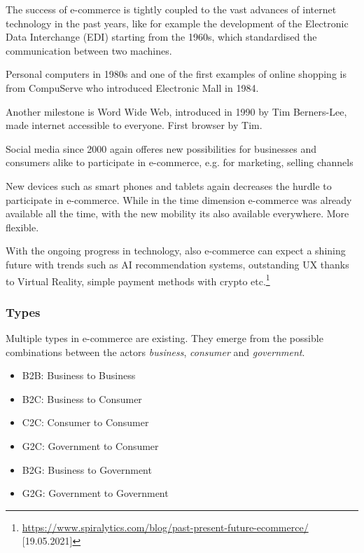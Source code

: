 The success of e-commerce is tightly coupled to the vast advances of internet technology in the past years, like for example the development of the Electronic Data Interchange (EDI) starting from the 1960s, which standardised the communication between two machines.

Personal computers in 1980s and one of the first examples of online shopping is from CompuServe who introduced Electronic Mall in 1984.

Another milestone is Word Wide Web, introduced in 1990 by Tim Berners-Lee, made internet accessible to everyone.
First browser by Tim.

Social media since 2000 again offeres new possibilities for businesses and consumers alike to participate in e-commerce, e.g. for marketing, selling channels

New devices such as smart phones and tablets again decreases the hurdle to participate in e-commerce.
While in the time dimension e-commerce was already available all the time, with the new mobility its also available everywhere.
More flexible.

With the ongoing progress in technology, also e-commerce can expect a shining future with trends such as AI recommendation systems, outstanding UX thanks to Virtual Reality, simple payment methods with crypto etc.\footnote{\url{https://www.spiralytics.com/blog/past-present-future-ecommerce/} [19.05.2021]}


\subsubsection{Types}

Multiple types in e-commerce are existing. They emerge from the possible combinations between the actors \textit{business}, \textit{consumer} and \textit{government}. %

\begin{itemize}
\item B2B: Business to Business
\item B2C: Business to Consumer
\item C2C: Consumer to Consumer
\item G2C: Government to Consumer
\item B2G: Business to Government
\item G2G: Government to Government
\end{itemize}

